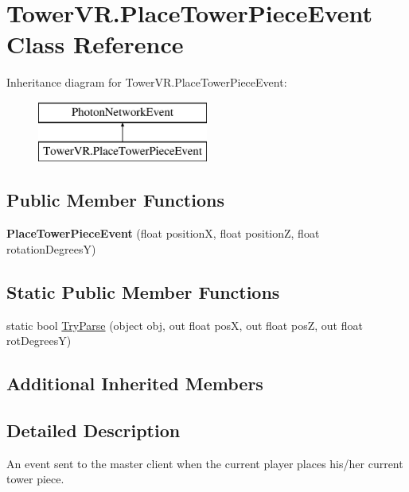 \hypertarget{class_tower_v_r_1_1_place_tower_piece_event}{}\section{Tower\+V\+R.\+Place\+Tower\+Piece\+Event Class Reference}
\label{class_tower_v_r_1_1_place_tower_piece_event}
Inheritance diagram for Tower\+V\+R.\+Place\+Tower\+Piece\+Event\+:\begin{figure}[H]
\begin{center}
\leavevmode
\includegraphics[height=2.000000cm]{class_tower_v_r_1_1_place_tower_piece_event}
\end{center}
\end{figure}
\subsection*{Public Member Functions}
\begin{DoxyCompactItemize}
\item 
{\bfseries Place\+Tower\+Piece\+Event} (float positionX, float positionZ, float rotation\+DegreesY)\hypertarget{class_tower_v_r_1_1_place_tower_piece_event_a3d2c63251ae5eaba62b4ba45ba33aee3}{}\label{class_tower_v_r_1_1_place_tower_piece_event_a3d2c63251ae5eaba62b4ba45ba33aee3}

\end{DoxyCompactItemize}
\subsection*{Static Public Member Functions}
\begin{DoxyCompactItemize}
\item 
static bool \hyperlink{class_tower_v_r_1_1_place_tower_piece_event_a8a17a8e6f863a9d0b0405279d0bb6ed4}{Try\+Parse} (object obj, out float posX, out float posZ, out float rot\+DegreesY)
\end{DoxyCompactItemize}
\subsection*{Additional Inherited Members}


\subsection{Detailed Description}
An event sent to the master client when the current player places his/her current tower piece. 

